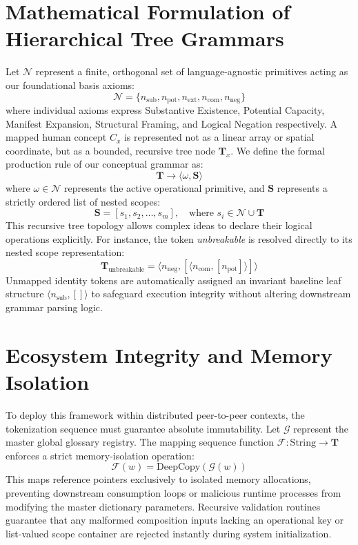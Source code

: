 \documentclass[10pt,journal,compsoc]{IEEEtran}
\begin{document}
\section{Mathematical Formulation of Hierarchical Tree Grammars}
Let $\mathcal{N}$ represent a finite, orthogonal set of language-agnostic primitives acting as our foundational basis axioms:
\begin{equation}
\mathcal{N} = \{n_{\text{sub}}, n_{\text{pot}}, n_{\text{ext}}, n_{\text{com}}, n_{\text{neg}}\}
\end{equation}
where individual axioms express Substantive Existence, Potential Capacity, Manifest Expansion, Structural Framing, and Logical Negation respectively. 
A mapped human concept $C_x$ is represented not as a linear array or spatial coordinate, but as a bounded, recursive tree node $\mathbf{T}_x$. We define the formal production rule of our conceptual grammar as:
\begin{equation}
\mathbf{T} \rightarrow \langle \omega, \mathbf{S} \rangle
\end{equation}
where $\omega \in \mathcal{N}$ represents the active operational primitive, and $\mathbf{S}$ represents a strictly ordered list of nested scopes:
\begin{equation}
\mathbf{S} = [s_1, s_2, \dots, s_m], \quad \text{where } s_i \in \mathcal{N} \cup \mathbf{T}
\end{equation}
This recursive tree topology allows complex ideas to declare their logical operations explicitly. For instance, the token \textit{unbreakable} is resolved directly to its nested scope representation:
\begin{equation}
\mathbf{T}_{\text{unbreakable}} = \langle n_{\text{neg}}, [\langle n_{\text{com}}, [n_{\text{pot}}]\rangle] \rangle
\end{equation}
Unmapped identity tokens are automatically assigned an invariant baseline leaf structure $\langle n_{\text{sub}}, [] \rangle$ to safeguard execution integrity without altering downstream grammar parsing logic.
\section{Ecosystem Integrity and Memory Isolation}
To deploy this framework within distributed peer-to-peer contexts, the tokenization sequence must guarantee absolute immutability. Let $\mathcal{G}$ represent the master global glossary registry. The mapping sequence function $\mathcal{F}: \text{String} \rightarrow \mathbf{T}$ enforces a strict memory-isolation operation:
\begin{equation}
\mathcal{F}(w) = \text{DeepCopy}(\mathcal{G}(w))
\end{equation}
This maps reference pointers exclusively to isolated memory allocations, preventing downstream consumption loops or malicious runtime processes from modifying the master dictionary parameters. Recursive validation routines guarantee that any malformed composition inputs lacking an operational key or list-valued scope container are rejected instantly during system initialization.
\end{document}

